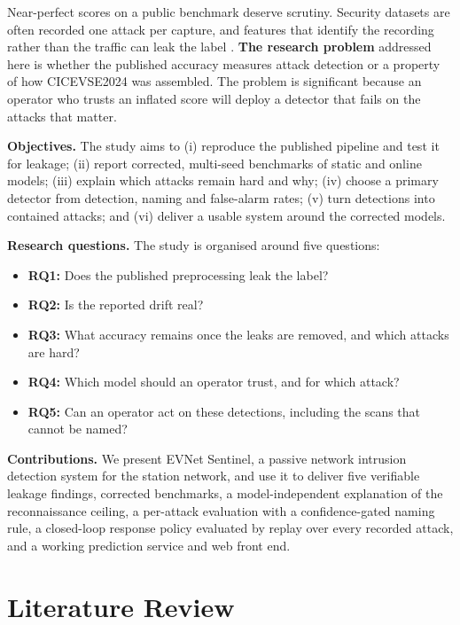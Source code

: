\documentclass[preprint,12pt]{elsarticle}
\begin{document}
Near-perfect scores on a public benchmark deserve scrutiny. Security datasets are often recorded one attack per capture, and features that identify the recording rather than the traffic can leak the label \cite{b10,b11,b13}. \textbf{The research problem} addressed here is whether the published accuracy measures attack detection or a property of how CICEVSE2024 was assembled. The problem is significant because an operator who trusts an inflated score will deploy a detector that fails on the attacks that matter.

\textbf{Objectives.} The study aims to (i) reproduce the published pipeline and test it for leakage; (ii) report corrected, multi-seed benchmarks of static and online models; (iii) explain which attacks remain hard and why; (iv) choose a primary detector from detection, naming and false-alarm rates; (v) turn detections into contained attacks; and (vi) deliver a usable system around the corrected models.

\textbf{Research questions.} The study is organised around five questions:
\begin{itemize}
    \item \textbf{RQ1:} Does the published preprocessing leak the label?
    \item \textbf{RQ2:} Is the reported drift real?
    \item \textbf{RQ3:} What accuracy remains once the leaks are removed, and which attacks are hard?
    \item \textbf{RQ4:} Which model should an operator trust, and for which attack?
    \item \textbf{RQ5:} Can an operator act on these detections, including the scans that cannot be named?
\end{itemize}

\textbf{Contributions.} We present EVNet Sentinel, a passive network intrusion detection system for the station network, and use it to deliver five verifiable leakage findings, corrected benchmarks, a model-independent explanation of the reconnaissance ceiling, a per-attack evaluation with a confidence-gated naming rule, a closed-loop response policy evaluated by replay over every recorded attack, and a working prediction service and web front end.

\section{Literature Review}
\label{sec:lit}
\end{document}
